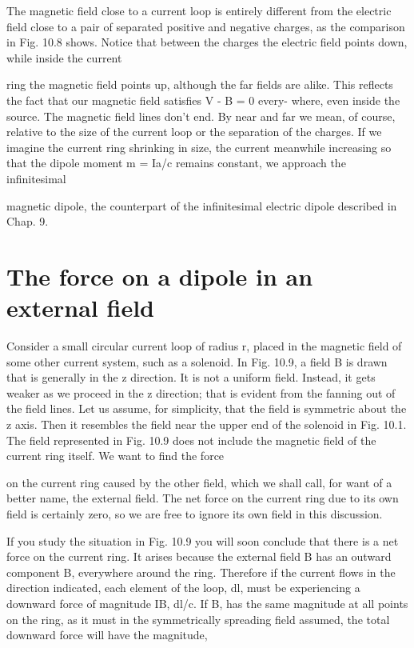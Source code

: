 {{%
The magnetic field close to a current loop is entirely different from
the electric field close to a pair of separated positive and negative
charges, as the comparison in Fig. 10.8 shows. Notice that between
the charges the electric field points down, while inside the current

ring the magnetic field points up, although the far fields are alike.
This reflects the fact that our magnetic field satisfies V - B = 0 every-
where, even inside the source. The magnetic field lines don't end.
By near and far we mean, of course, relative to the size of the current
loop or the separation of the charges. If we imagine the current ring
shrinking in size, the current meanwhile increasing so that the dipole
moment m = Ia/c remains constant, we approach the infinitesimal

magnetic dipole, the counterpart of the infinitesimal electric dipole
described in Chap. 9.

\section{The force on a dipole in an external field}

Consider a small circular current loop of radius r, placed in the
magnetic field of some other current system, such as a solenoid. In
Fig. 10.9, a field B is drawn that is generally in the z direction. It is
not a uniform field. Instead, it gets weaker as we proceed in the
z direction; that is evident from the fanning out of the field lines.
Let us assume, for simplicity, that the field is symmetric about the
z axis. Then it resembles the field near the upper end of the solenoid
in Fig. 10.1. The field represented in Fig. 10.9 does not include the
magnetic field of the current ring itself. We want to find the force

on the current ring caused by the other field, which we shall call, for
want of a better name, the external field. The net force on the current
ring due to its own field is certainly zero, so we are free to ignore
its own field in this discussion.

If you study the situation in Fig. 10.9 you will soon conclude that
there is a net force on the current ring. It arises because the external
field B has an outward component B, everywhere around the ring.
Therefore if the current flows in the direction indicated, each element
of the loop, dl, must be experiencing a downward force of magnitude
IB, dl/c. If B, has the same magnitude at all points on the
ring, as it must in the symmetrically spreading field assumed, the
total downward force will have the magnitude,

}}

